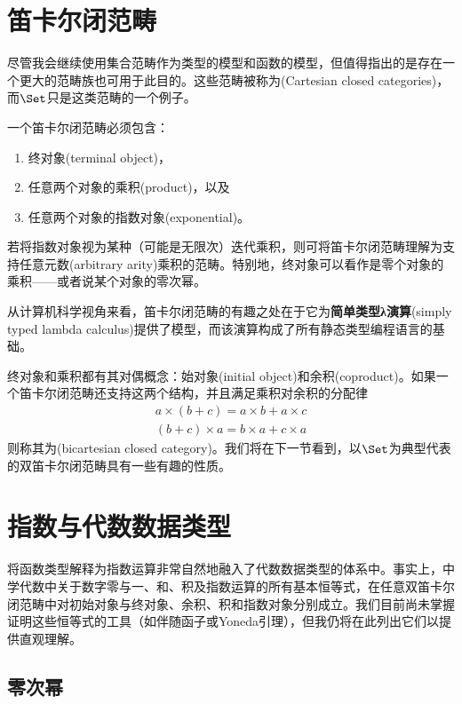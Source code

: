 \section{笛卡尔闭范畴}

尽管我会继续使用集合范畴作为类型的模型和函数的模型，但值得指出的是存在一个更大的范畴族也可用于此目的。这些范畴被称为(Cartesian closed categories)，而$\Set$只是这类范畴的一个例子。

一个笛卡尔闭范畴必须包含：

\begin{enumerate}
  \tightlist
  \item
        终对象(terminal object)，
  \item
        任意两个对象的乘积(product)，以及
  \item
        任意两个对象的指数对象(exponential)。
\end{enumerate}
若将指数对象视为某种（可能是无限次）迭代乘积，则可将笛卡尔闭范畴理解为支持任意元数(arbitrary arity)乘积的范畴。特别地，终对象可以看作是零个对象的乘积——或者说某个对象的零次幂。

从计算机科学视角来看，笛卡尔闭范畴的有趣之处在于它为\textbf{简单类型λ演算}(simply typed lambda calculus)提供了模型，而该演算构成了所有静态类型编程语言的基础。

终对象和乘积都有其对偶概念：始对象(initial object)和余积(coproduct)。如果一个笛卡尔闭范畴还支持这两个结构，并且满足乘积对余积的分配律
\begin{gather*}
  a \times (b + c) = a \times b + a \times c \\
  (b + c) \times a = b \times a + c \times a
\end{gather*}
则称其为(bicartesian closed category)。我们将在下一节看到，以$\Set$为典型代表的双笛卡尔闭范畴具有一些有趣的性质。

\section{指数与代数数据类型}

将函数类型解释为指数运算非常自然地融入了代数数据类型的体系中。事实上，中学代数中关于数字零与一、和、积及指数运算的所有基本恒等式，在任意双笛卡尔闭范畴中对初始对象与终对象、余积、积和指数对象分别成立。我们目前尚未掌握证明这些恒等式的工具（如伴随函子或Yoneda引理），但我仍将在此列出它们以提供直观理解。

\subsection{零次幂}

